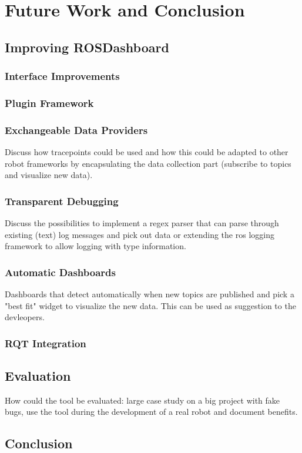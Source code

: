 \chapter{Future Work and Conclusion}
\label{future_work}

\section{Improving ROSDashboard}
\subsection{Interface Improvements}
\subsection{Plugin Framework}
\subsection{Exchangeable Data Providers}
Discuss how tracepoints could be used and how this could be adapted to other robot frameworks by encapsulating the data collection part (subscribe to topics and visualize new data).
\subsection{Transparent Debugging}
Discuss the possibilities to implement a regex parser that can parse through existing (text) log messages and pick out data or extending the ros logging framework to allow logging with type information.
\subsection{Automatic Dashboards}
Dashboards that detect automatically when new topics are published and pick a "best fit" widget to visualize the new data. This can be used as suggestion to the devleopers.
\subsection{RQT Integration}

\section{Evaluation}
How could the tool be evaluated: large case study on a big project with fake bugs, use the tool during the development of a real robot and document benefits.

\section{Conclusion}
